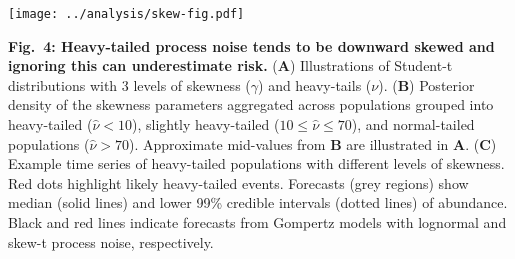 \clearpage

\begin{center}
\texttt{[image: ../analysis/skew-fig.pdf]}
\end{center}

\textbf{Fig.~4: Heavy-tailed process noise tends to be downward skewed and ignoring this can underestimate risk.} (\textbf{A}) Illustrations of Student-t distributions with 3 levels of skewness (\(\gamma\)) and heavy-tails (\(\nu\)). (\textbf{B}) Posterior density of the skewness parameters aggregated across populations grouped into heavy-tailed (\(\hat{\nu} < 10\)), slightly heavy-tailed (\(10 \leq \hat{\nu} \leq 70\)), and normal-tailed populations (\(\hat{\nu} > 70\)). Approximate mid-values from \textbf{B} are illustrated in \textbf{A}. (\textbf{C}) Example time series of heavy-tailed populations with different levels of skewness. Red dots highlight likely heavy-tailed events. Forecasts (grey regions) show median (solid lines) and lower 99\% credible intervals (dotted lines) of abundance. Black and red lines indicate forecasts from Gompertz models with lognormal and skew-t process noise, respectively.


